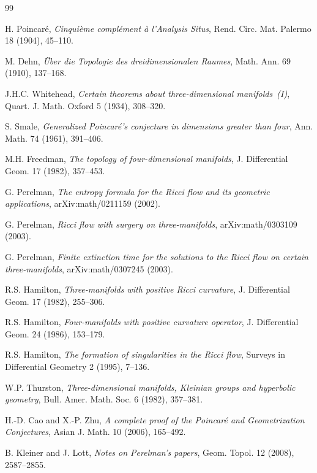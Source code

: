 \documentclass[11pt]{article}
\begin{document}
\begin{thebibliography}{99}

H. Poincar\'e, \emph{Cinqui\`eme compl\'ement \`a l'Analysis Situs},
Rend. Circ. Mat. Palermo 18 (1904), 45--110.

M. Dehn, \emph{\"Uber die Topologie des dreidimensionalen Raumes},
Math. Ann. 69 (1910), 137--168.

J.H.C. Whitehead, \emph{Certain theorems about three-dimensional manifolds~(I)},
Quart. J. Math. Oxford 5 (1934), 308--320.

S. Smale, \emph{Generalized Poincar\'e's conjecture in dimensions greater
than four}, Ann. Math. 74 (1961), 391--406.

M.H. Freedman, \emph{The topology of four-dimensional manifolds},
J. Differential Geom. 17 (1982), 357--453.

G. Perelman, \emph{The entropy formula for the Ricci flow and its
geometric applications}, arXiv:math/0211159 (2002).

G. Perelman, \emph{Ricci flow with surgery on three-manifolds},
arXiv:math/0303109 (2003).

G. Perelman, \emph{Finite extinction time for the solutions to the
Ricci flow on certain three-manifolds}, arXiv:math/0307245 (2003).

R.S. Hamilton, \emph{Three-manifolds with positive Ricci curvature},
J. Differential Geom. 17 (1982), 255--306.

R.S. Hamilton, \emph{Four-manifolds with positive curvature operator},
J. Differential Geom. 24 (1986), 153--179.

R.S. Hamilton, \emph{The formation of singularities in the Ricci flow},
Surveys in Differential Geometry 2 (1995), 7--136.

W.P. Thurston, \emph{Three-dimensional manifolds, Kleinian groups and
hyperbolic geometry}, Bull. Amer. Math. Soc. 6 (1982), 357--381.

H.-D. Cao and X.-P. Zhu, \emph{A complete proof of the Poincar\'e
and Geometrization Conjectures}, Asian J. Math. 10 (2006), 165--492.

B. Kleiner and J. Lott, \emph{Notes on Perelman's papers},
Geom. Topol. 12 (2008), 2587--2855.


\end{thebibliography}
\end{document}
